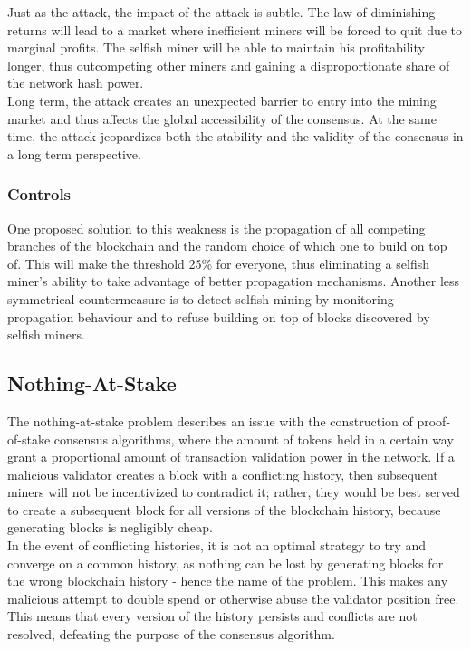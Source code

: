 \documentclass[11pt,a4paper,draft]{article}
\begin{document}
Just as the attack, the impact of the attack is subtle. The law of diminishing returns will lead to a market where inefficient miners will be forced to quit due to marginal profits. The selfish miner will be able to maintain his profitability longer, thus outcompeting other miners and gaining a disproportionate share of the network hash power.\\

Long term, the attack creates an unexpected barrier to entry into the mining market and thus affects the global accessibility of the consensus. At the same time, the attack jeopardizes both the stability and the validity of the consensus in a long term perspective.\\

\subsubsection{Controls}

One proposed solution to this weakness is the propagation of all competing branches of the blockchain and the random choice of which one to build on top of. This will make the threshold 25\% for everyone, thus eliminating a selfish miner's ability to take advantage of better propagation mechanisms. Another less symmetrical countermeasure is to detect selfish-mining by monitoring propagation behaviour and to refuse building on top of blocks discovered by selfish miners.\\

\subsection{Nothing-At-Stake}

The nothing-at-stake problem describes an issue with the construction of proof-of-stake consensus algorithms, where the amount of tokens held in a certain way grant a proportional amount of transaction validation power in the network. If a malicious validator creates a block with a conflicting history, then subsequent miners will not be incentivized to contradict it; rather, they would be best served to create a subsequent block for all versions of the blockchain history, because generating blocks is negligibly cheap.\\

In the event of conflicting histories, it is not an optimal strategy to try and converge on a common history, as nothing can be lost by generating blocks for the wrong blockchain history - hence the name of the problem. This makes any malicious attempt to double spend or otherwise abuse the validator position free. This means that every version of the history persists and conflicts are not resolved, defeating the purpose of the consensus algorithm.\\
\end{document}
